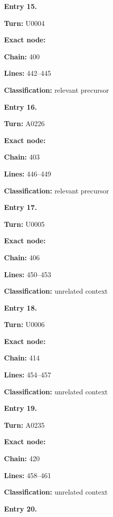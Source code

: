 \documentclass[10pt,a4paper,oneside]{report}
\begin{document}
\textbf{Entry 15.}

\textbf{Turn:} U0004

\textbf{Exact node:} \protect{}

\textbf{Chain:} 400

\textbf{Lines:} 442--445

\textbf{Classification:} relevant precursor


\textbf{Entry 16.}

\textbf{Turn:} A0226

\textbf{Exact node:} \protect{}

\textbf{Chain:} 403

\textbf{Lines:} 446--449

\textbf{Classification:} relevant precursor


\textbf{Entry 17.}

\textbf{Turn:} U0005

\textbf{Exact node:} \protect{}

\textbf{Chain:} 406

\textbf{Lines:} 450--453

\textbf{Classification:} unrelated context


\textbf{Entry 18.}

\textbf{Turn:} U0006

\textbf{Exact node:} \protect{}

\textbf{Chain:} 414

\textbf{Lines:} 454--457

\textbf{Classification:} unrelated context


\textbf{Entry 19.}

\textbf{Turn:} A0235

\textbf{Exact node:} \protect{}

\textbf{Chain:} 420

\textbf{Lines:} 458--461

\textbf{Classification:} unrelated context


\textbf{Entry 20.}
\end{document}
